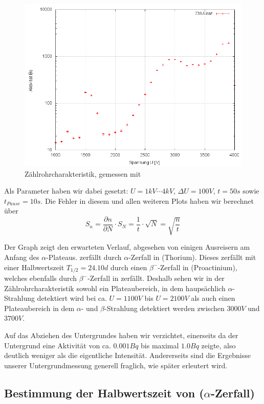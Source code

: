 \begin{figure}[H]
 \centering \includegraphics[width=0.9\linewidth]{Messwerte/plots/U238.png}
 \caption{Zählrohrcharakteristik, gemessen mit }
\end{figure}
Als Parameter haben wir dabei gesetzt: $U = 1kV \cdots 4kV$, $\Delta U = 100 V$, $t = 50s$ sowie $t_{Pause} = 10s$. Die Fehler in diesem und allen weiteren Plots haben wir berechnet über
\begin{equation}
 S_n = \frac{\partial n}{\partial N} \cdot S_N = \frac{1}{t} \cdot \sqrt{N} = \sqrt{\frac{n}{t}}
\end{equation}


Der Graph zeigt den erwarteten Verlauf, abgesehen von einigen Ausreisern am Anfang des $\alpha$-Plateaus.  zerfällt durch $\alpha$-Zerfall in  (Thorium). Dieses zerfällt mit einer Halbwertszeit $T_{1/2} = 24.10d$ durch einen $\beta^-$-Zerfall in  (Proactinium), welches ebenfalls durch $\beta^-$-Zerfall in  zerfällt. Deshalb sehen wir in der Zählrohrcharakteristik sowohl ein Plateaubereich, in dem haupsächlich $\alpha$-Strahlung detektiert wird bei ca. $U = 1100V$ bis $U = 2100V$ als auch einen Plateaubereich in dem $\alpha$- und $\beta$-Strahlung detektiert werden zwischen $3000V$ und $3700V$.

Auf das Abziehen des Untergrundes haben wir verzichtet, einerseits da der Untergrund eine Aktivität von ca. $0.001Bq$ bis maximal $1.0Bq$ zeigte, also deutlich weniger als die eigentliche Intensität. Andererseits sind die Ergebnisse unserer Untergrundmessung generell  fraglich, wie später erleutert wird.

\subsection{Bestimmung der Halbwertszeit von  ($\alpha$-Zerfall)}

